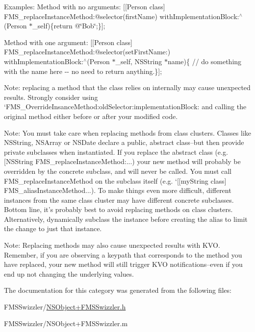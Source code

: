 Examples\-: Method with no arguments\-: {\ttfamily \mbox{[}\mbox{[}Person class\mbox{]} F\-M\-S\-\_\-replace\-Instance\-Method\-:@selector(first\-Name) with\-Implementation\-Block\-:$^\wedge$(Person $\ast$\-\_\-self)\{return @\char`\"{}\-Bob\char`\"{};\}\mbox{]};}

Method with one argument\-: {\ttfamily \mbox{[}\mbox{[}Person class\mbox{]} F\-M\-S\-\_\-replace\-Instance\-Method\-:@selector(set\-First\-Name\-:) with\-Implementation\-Block\-:$^\wedge$(Person $\ast$\-\_\-self, N\-S\-String $\ast$name)\{ // do something with the name here -\/-\/ no need to return anything.\}\mbox{]};}

Note\-: replacing a method that the class relies on internally may cause unexpected results. Strongly consider using `\-F\-M\-S\-\_\-\-Override\-Insance\-Method\-:old\-Selector\-:implementation\-Block\-: and calling the original method either before or after your modified code.

Note\-: You must take care when replacing methods from class clusters. Classes like N\-S\-String, N\-S\-Array or N\-S\-Date declare a public, abstract class--but then provide private subclasses when instantiated. If you replace the abstract class (e.\-g. {\ttfamily \mbox{[}N\-S\-String F\-M\-S\-\_\-replace\-Instance\-Method\-:...}) your new method will probably be overridden by the concrete subclass, and will never be called. You must call {\ttfamily F\-M\-S\-\_\-replace\-Instance\-Method} on the subclass itself (e.\-g. `\mbox{[}\mbox{[}my\-String class\mbox{]} F\-M\-S\-\_\-alias\-Instance\-Method...). To make things even more difficult, different instances from the same class cluster may have different concrete subclasses. Bottom line, it's probably best to avoid replacing methods on class clusters. Alternatively, dynamically subclass the instance before creating the alias to limit the change to just that instance.

Note\-: Replacing methods may also cause unexpected results with K\-V\-O. Remember, if you are observing a keypath that corresponds to the method you have replaced, your new method will still trigger K\-V\-O notifications--even if you end up not changing the underlying values. 

The documentation for this category was generated from the following files\-:\begin{DoxyCompactItemize}
\item 
F\-M\-S\-Swizzler/\hyperlink{_n_s_object_09_f_m_s_swizzler_8h}{N\-S\-Object+\-F\-M\-S\-Swizzler.\-h}\item 
F\-M\-S\-Swizzler/N\-S\-Object+\-F\-M\-S\-Swizzler.\-m\end{DoxyCompactItemize}
